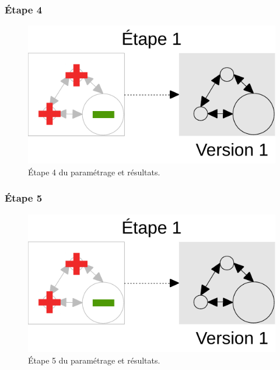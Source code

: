 	\subsubsection{Étape 4}
		\begin{figure}[H]
			\centering
			\includegraphics[width = \linewidth, page = 4]{img/schemas_etapes_individuelles.pdf}
			\caption{Étape 4 du paramétrage et résultats.}
		\end{figure}

\pagebreak
	\subsubsection{Étape 5}
		\begin{figure}[H]
			\centering
			\includegraphics[width = \linewidth, page = 5]{img/schemas_etapes_individuelles.pdf}
			\caption{Étape 5 du paramétrage et résultats.}
		\end{figure}

\pagebreak
